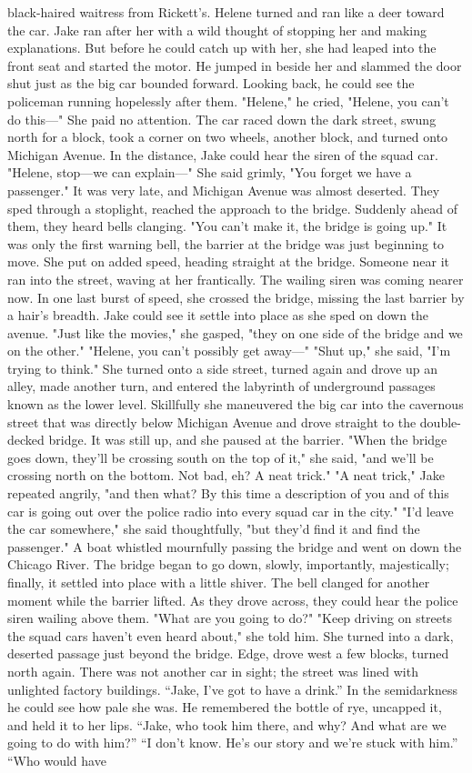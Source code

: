 \documentclass{novel}
\begin{document}
black-haired waitress from Rickett's. Helene turned and ran like a deer toward the car. Jake ran after her with a wild thought of stopping her and making explanations. But before he could catch up with her, she had leaped into the front seat and started the motor. He jumped in beside her and slammed the door shut just as the big car bounded forward. Looking back, he could see the policeman running hopelessly after them. "Helene," he cried, "Helene, you can't do this—" She paid no attention. The car raced down the dark street, swung north for a block, took a corner on two wheels, another block, and turned onto Michigan Avenue. In the distance, Jake could hear the siren of the squad car. "Helene, stop—we can explain—" She said grimly, "You forget we have a passenger." It was very late, and Michigan Avenue was almost deserted. They sped through a stoplight, reached the approach to the bridge. Suddenly ahead of them, they heard bells clanging. "You can't make it, the bridge is going up." It was only the first warning bell, the barrier at the bridge was just beginning to move. She put on added speed, heading straight at the bridge. Someone near it ran into the street, waving at her frantically. The wailing siren was coming nearer now. In one last burst of speed, she crossed the bridge, missing the last barrier by a hair's breadth. Jake could see it settle into place as she sped on down the avenue. "Just like the movies," she gasped, "they on one side of the bridge and we on the other." "Helene, you can't possibly get away—" "Shut up," she said, "I'm trying to think." She turned onto a side street, turned again and drove up an alley, made another turn, and entered the labyrinth of underground passages known as the lower level. Skillfully she maneuvered the big car into the cavernous street that was directly below Michigan Avenue and drove straight to the double-decked bridge. It was still up, and she paused at the barrier. "When the bridge goes down, they'll be crossing south on the top of it," she said, "and we'll be crossing north on the bottom. Not bad, eh? A neat trick." "A neat trick," Jake repeated angrily, "and then what? By this time a description of you and of this car is going out over the police radio into every squad car in the city." "I'd leave the car somewhere," she said thoughtfully, "but they'd find it and find the passenger." A boat whistled mournfully passing the bridge and went on down the Chicago River. The bridge began to go down, slowly, importantly, majestically; finally, it settled into place with a little shiver. The bell clanged for another moment while the barrier lifted. As they drove across, they could hear the police siren wailing above them. "What are you going to do?" "Keep driving on streets the squad cars haven't even heard about," she told him. She turned into a dark, deserted passage just beyond the bridge. Edge, drove west a few blocks, turned north again. There was not another car in sight; the street was lined with unlighted factory buildings. “Jake, I've got to have a drink.” In the semidarkness he could see how pale she was. He remembered the bottle of rye, uncapped it, and held it to her lips. “Jake, who took him there, and why? And what are we going to do with him?” “I don’t know. He’s our story and we’re stuck with him.” “Who would have 
\end{document}
